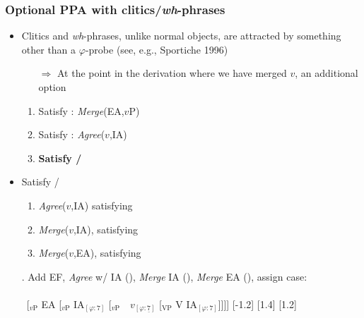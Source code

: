 \documentclass[letterpaper,10pt]{handout_nick}
\begin{document}
\subsubsection{Optional PPA with clitics/\emph{wh}-phrases}
\begin{itemize}
\item Clitics and \emph{wh}-phrases, unlike normal objects, are attracted by something other than a $\varphi$-probe (see, e.g., Sportiche 1996)
\begin{itemize}
\item[$\Rightarrow$] At the point in the derivation where we have merged $v$, an additional option
\end{itemize}
\begin{enumerate}
\item Satisfy \fm{$\varphi$}: \emph{Merge}(EA,$v$P)
\item Satisfy \fa{$\varphi$}: \emph{Agree}($v$,IA)
\item \textbf{Satisfy /}
\end{enumerate}
\item Satisfy /
\begin{enumerate}
\item \emph{Agree}($v$,IA) satisfying 
\item \emph{Merge}($v$,IA), satisfying  %
\item \emph{Merge}($v$,EA), satisfying \fm{$\varphi$}
\end{enumerate}
\ex. Add EF, \emph{Agree} w/ IA (), \emph{Merge} IA (), \emph{Merge} EA (\fms{$\varphi$}), assign case:\\\\
\ [$_\text{$v$P}$ \hspace*{-.3cm}EA [$_\text{$v$P}$ \hspace*{-.3cm}IA$_{[\varphi:7]}$ [$_\text{$v$P}$\ \ \hspace*{-.2cm}\hspace*{-.2cm}$v_{[\varphi:\underline{7}]}$ [$_\text{VP}$ V \hspace*{-.3cm}IA$_{[\varphi:7]}$]]]]
[-1.2]
[1.4]
[1.2]\\


\end{itemize}
\end{document}
